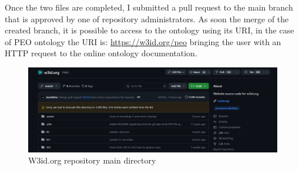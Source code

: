Once the two files are completed, I submitted a pull request to the main branch that is approved by one of repository administrators. As soon the merge of the created branch, it is possible to access to the ontology using its URI, in the case of PEO ontology the URI is: \href{https://w3id.org/peo}{https://w3id.org/peo} bringing the user with an HTTP request to the online ontology documentation.
\begin{figure}[H]
    \centering
    \includegraphics[width=0.9\linewidth]{Figures/fig_66.png}
    \caption{W3id.org repository main directory}
    \label{fig:enter-label}
\end{figure}

